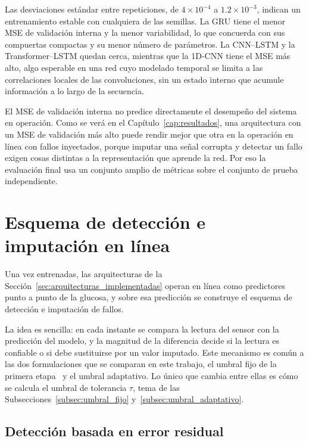 \documentclass{report}
\begin{document}
Las desviaciones estándar entre repeticiones, de $4 \times 10^{-4}$ a $1.2 \times 10^{-3}$, indican un entrenamiento estable con cualquiera de las semillas. La GRU tiene el menor MSE de validación interna y la menor variabilidad, lo que concuerda con sus compuertas compactas y su menor número de parámetros. La CNN--LSTM y la Transformer--LSTM quedan cerca, mientras que la 1D-CNN tiene el MSE más alto, algo esperable en una red cuyo modelado temporal se limita a las correlaciones locales de las convoluciones, sin un estado interno que acumule información a lo largo de la secuencia.

El MSE de validación interna no predice directamente el desempeño del sistema en operación. Como se verá en el Capítulo~\ref{cap:resultados}, una arquitectura con un MSE de validación más alto puede rendir mejor que otra en la operación en línea con fallos inyectados, porque imputar una señal corrupta y detectar un fallo exigen cosas distintas a la representación que aprende la red. Por eso la evaluación final usa un conjunto amplio de métricas sobre el conjunto de prueba independiente.

\section{Esquema de detección e imputación en línea}
\label{sec:deteccion_fallos}

Una vez entrenadas, las arquitecturas de la Sección~\ref{sec:arquitecturas_implementadas} operan en línea como predictores punto a punto de la glucosa, y sobre esa predicción se construye el esquema de detección e imputación de fallos.

La idea es sencilla: en cada instante se compara la lectura del sensor con la predicción del modelo, y la magnitud de la diferencia decide si la lectura es confiable o si debe sustituirse por un valor imputado. Este mecanismo es común a las dos formulaciones que se comparan en este trabajo, el umbral fijo de la primera etapa~\cite{sanchez2025imputation} y el umbral adaptativo. Lo único que cambia entre ellas es cómo se calcula el umbral de tolerancia $\tau$, tema de las Subsecciones~\ref{subsec:umbral_fijo} y~\ref{subsec:umbral_adaptativo}.

\subsection*{Detección basada en error residual}
\label{subsec:principio_deteccion}
\end{document}
